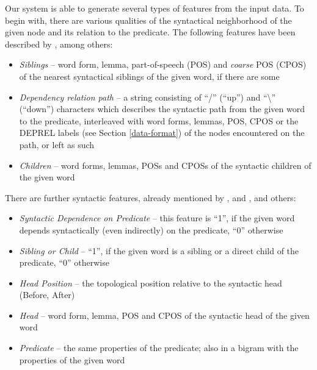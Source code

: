 \documentclass[12pt,notitlepage]{report}
\begin{document}
Our system is able to generate several types of features from the input data. To begin with, there are various qualities of the syntactical neighborhood of the given node and its relation to the predicate. The following features have been described by \citet{nugues09}, among others:
\begin{itemize}
    \item \emph{Siblings} -- word form, lemma, part-of-speech (POS) and \emph{coarse} POS (CPOS) \citep[first character of the POS-tag][]{che09} of the nearest syntactical siblings of the given word, if there are some
    \item \emph{Dependency relation path} -- a string consisting of ``/'' (``up'') and ``\textbackslash'' (``down'') characters which describes the syntactic path from the given word to the predicate, interleaved with word forms, lemmas, POS, CPOS or the DEPREL labels (see Section \ref{data-format}) of the nodes encountered on the path, or left as such
    \item \emph{Children} -- word forms, lemmas, POSs and CPOSs of the syntactic children of the given word
\end{itemize}

There are further syntactic features, already mentioned by \citet{zeman09}, \citet{chen09} and \citet{asahara09}, and others:
\begin{itemize}
    \item \emph{Syntactic Dependence on Predicate} -- this feature is ``1'', if the given word depends syntactically (even indirectly) on the predicate, ``0'' otherwise
    \item \emph{Sibling or Child} -- ``1'', if the given word is a sibling or a direct child of the predicate, ``0'' otherwise
    \item \emph{Head Position} -- the topological position relative to the syntactic head (Before, After)
    \item \emph{Head} -- word form, lemma, POS and CPOS of the syntactic head of the given word
    \item \emph{Predicate} -- the same properties of the predicate; also in a bigram with the properties of the given word
\end{itemize}
\end{document}
